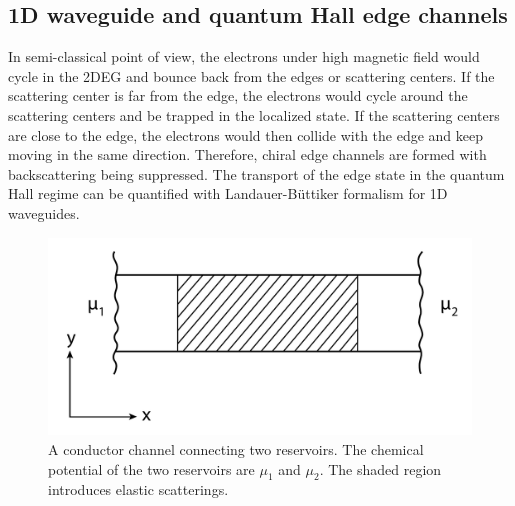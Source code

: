 \documentclass[pdflatex, sectionletters, 12pt, final, phd]{pittetd}    %
\begin{document}
\subsection{1D waveguide and quantum Hall edge channels}

In semi-classical point of view, the electrons under high magnetic field would cycle in the 2DEG and bounce back from the edges or scattering centers. If the scattering center is far from the edge, the electrons would cycle around the scattering centers and be trapped in the localized state. If the scattering centers are close to the edge, the electrons would then collide with the edge and keep moving in the same direction. Therefore, chiral edge channels are formed with backscattering being suppressed. The transport of the edge state in the quantum Hall regime can be quantified with Landauer-B{\"u}ttiker formalism for 1D waveguides\cite{buttiker1986four, buttiker1988absence}.

\begin{figure}[h!]
	\centering
	\vspace{0.85cm}
	\includegraphics[width=.5\textwidth]{Drawing/Channel.pdf}
	\caption[A conductor channel connecting two reservoirs]{A conductor channel connecting two reservoirs. The chemical potential of the two reservoirs are $\mu_1$ and $\mu_2$. The shaded region introduces elastic scatterings.}
	\label{FIG:Channel}
\end{figure}
\end{document}
